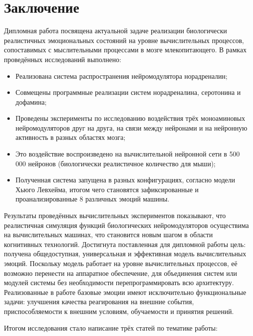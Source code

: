 \cleardoublepage
{}
{}
\chapter*{Заключение}
\label{chap:conclusion}
Дипломная работа посвящена актуальной задаче реализации биологически реалистичных эмоциональных состояний на уровне вычислительных процессов, сопоставимых с мыслительными процессами в мозге млекопитающего. В рамках проведённых исследований выполнено:
\begin{itemize}
\item Реализована система распространения нейромодулятора норадреналин;
\item Совмещены программные реализации систем норадреналина, серотонина и дофамина;
\item Проведены эксперименты по исследованию воздействия трёх моноаминовых нейромодуляторов друг на друга, на связи между нейронами и на нейронную активность в разных областях мозга;
\item Это воздействие воспроизведено на вычислительной нейронной сети в 500 000 нейронов (биологически реалистичное количество для мыши);
\item Полученная система запущена в разных конфигурациях, согласно модели Хьюго Левхейма, итогом чего становятся зафиксированные и проанализированные 8 различных эмоций машины.
\end{itemize}
	
	
Результаты проведённых вычислительных экспериментов показывают, что реалистичная симуляция функций биологических нейромодуляторов осуществима на вычислительных машинах, что становится новым шагом в области когнитивных технологий. Достигнута поставленная для дипломной работы цель: получена общедоступная, универсальная и эффективная модель вычислительных эмоций. Поскольку модель работает на уровне вычислительных процессов, её возможно перенести на аппаратное обеспечение, для объединения систем или модулей системы без необходимости перепрограммировать всю архитектуру. Реализованные в работе базовые эмоции имеют исключительно функциональные задачи: улучшения качества реагирования на внешние события, приспособляемости к внешним условиям, обучаемости и принятия решений.


Итогом исследования стало написание трёх статей по тематике работы:

